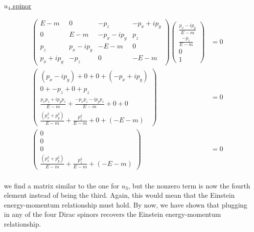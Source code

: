 \documentclass[11pt]{article}
\theoremstyle{definition}
\begin{document}
\underline{$u_4$ spinor}

\begin{align}
    \begin{pmatrix}
        E-m & 0 & -p_{z} & - p_{x} + ip_{y}\\
        0 & E-m & - p_{x} - ip_{y} & p_{z}\\
        p_{z} & p_{x} - ip_{y} & -E-m & 0\\
        p_{x} + ip_{y} & -p_{z} & 0 & -E-m
    \end{pmatrix}
    \begin{pmatrix}
        \frac{p_x - ip_y}{E-m}\\
        \frac{-p_z}{E-m}\\
        0\\
        1
    \end{pmatrix}  &= 0\\
    \begin{pmatrix}
        (p_x-ip_y) + 0 + 0 + (-p_x+ip_y)\\
        0 + -p_z + 0 + p_z\\
        \frac{p_xp_z + ip_yp_z}{E-m} + \frac{-p_xp_z - ip_yp_z}{E-m} + 0 + 0\\
        \frac{(p_x^2 + p_y^2)}{E-m} + \frac{p_z^2}{E-m} + 0 + (-E-m)
    \end{pmatrix}&= 0\\
    \begin{pmatrix}
        0\\
        0\\
         0\\
        \frac{(p_x^2 + p_y^2)}{E-m} + \frac{p_z^2}{E-m} + (-E-m)
    \end{pmatrix}&= 0\\
\end{align}

\begin{mdframed}
    we find a matrix similar to the one for $u_3$, but the nonzero term is now the fourth element instead of being the third. Again, this would mean that the Einstein energy-momentum relationship must hold. By now, we have shown that plugging in any of the four Dirac spinors recovers the Einstein energy-momentum relationship.
\end{mdframed}


\end{document}
